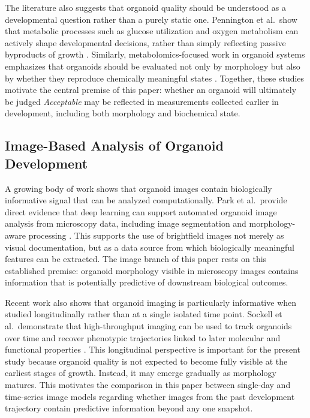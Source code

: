 \documentclass{article}
\begin{document}
The literature also suggests that organoid quality should be understood as a developmental question rather than a purely static one. Pennington et al.\ show that metabolic processes such as glucose utilization and oxygen metabolism can actively shape developmental decisions, rather than simply reflecting passive byproducts of growth \cite{pennington2025}. Similarly, metabolomics-focused work in organoid systems emphasizes that organoids should be evaluated not only by morphology but also by whether they reproduce chemically meaningful states \cite{murphy2022}. Together, these studies motivate the central premise of this paper: whether an organoid will ultimately be judged \textit{Acceptable} may be reflected in measurements collected earlier in development, including both morphology and biochemical state.

\subsection{Image-Based Analysis of Organoid Development}

A growing body of work shows that organoid images contain biologically informative signal that can be analyzed computationally. Park et al.\ provide direct evidence that deep learning can support automated organoid image analysis from microscopy data, including image segmentation and morphology-aware processing \cite{park2023}. This supports the use of brightfield images not merely as visual documentation, but as a data source from which biologically meaningful features can be extracted. The image branch of this paper rests on this established premise: organoid morphology visible in microscopy images contains information that is potentially predictive of downstream biological outcomes.

Recent work also shows that organoid imaging is particularly informative when studied longitudinally rather than at a single isolated time point. Sockell et al.\ demonstrate that high-throughput imaging can be used to track organoids over time and recover phenotypic trajectories linked to later molecular and functional properties \cite{sockell2023}. This longitudinal perspective is important for the present study because organoid quality is not expected to become fully visible at the earliest stages of growth. Instead, it may emerge gradually as morphology matures. This motivates the comparison in this paper between single-day and time-series image models regarding whether images from the past development trajectory contain predictive information beyond any one snapshot.
\end{document}
